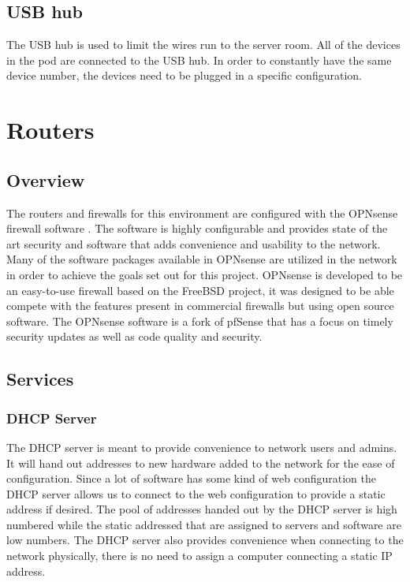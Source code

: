\documentclass[12pt]{IEEEtran}
\begin{document}
\subsection{USB hub}
The USB hub is used to limit the wires run to the server room.
All of the devices in the pod are connected to the USB hub.
In order to constantly have the same device number, the devices need to be plugged in a specific configuration.



\section{Routers}

\subsection{Overview}
The routers and firewalls for this environment are configured with the OPNsense firewall software \cite{opnsense}.
The software is highly configurable and provides state of the art security and software that adds convenience and usability to the network.
Many of the software packages available in OPNsense are utilized in the network in order to achieve the goals set out for this project.
OPNsense is developed to be an easy-to-use firewall based on the FreeBSD project, it was designed to be able compete with the features present in commercial firewalls but using open source software.
The OPNsense software is a fork of pfSense\cite{pfsense} that has a focus on timely security updates as well as code quality and security\cite{opnsenseabout}. 

\subsection{Services}
\subsubsection{DHCP Server}
The DHCP server is meant to provide convenience to network users and admins.
It will hand out addresses to new hardware added to the network for the ease of configuration. 
Since a lot of software has some kind of web configuration the DHCP server allows us to connect to the web configuration to provide a static address if desired. 
The pool of addresses handed out by the DHCP server is high numbered while the static addressed that are assigned to servers and software are low numbers. 
The DHCP server also provides convenience when connecting to the network physically, there is no need to assign a computer connecting a static IP address. 
\end{document}
